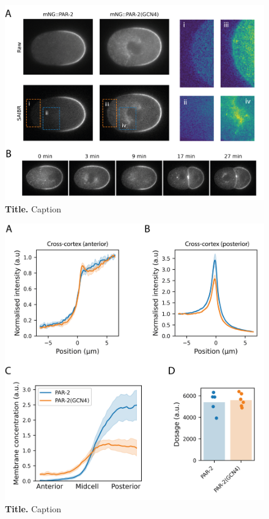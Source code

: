 \documentclass[12pt]{"article"}
\newcommand{\mycaption}[2]{\caption[#1]{\textbf{#1.} #2}}
\begin{document}
\begin{figure}[!h]
\includegraphics[scale=1]{gcn4}
\setlength{\abovecaptionskip}{20pt}
\centering
\mycaption{Title}{Caption}
\end{figure}

\begin{figure}[!h]
\includegraphics[scale=1]{gcn4_quantification}
\setlength{\abovecaptionskip}{20pt}
\centering
\mycaption{Title}{Caption}
\end{figure}
\end{document}
